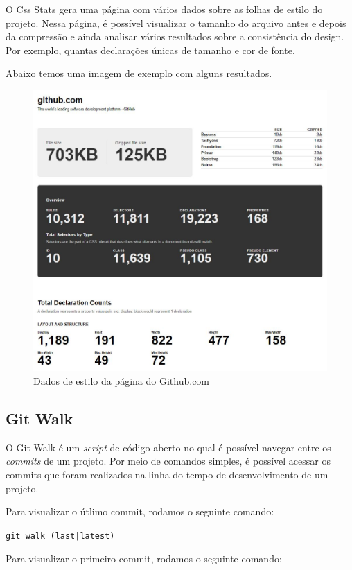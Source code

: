 O Css Stats gera uma página com vários dados sobre as folhas de estilo do projeto. Nessa página, é possível visualizar o tamanho do arquivo antes e depois da compressão e ainda analisar vários resultados sobre a consistência do design. Por exemplo, quantas declarações únicas de tamanho e cor de fonte.

Abaixo temos uma imagem de exemplo com alguns resultados.

\begin{figure}[H]
\centering
\includegraphics{figuras/Capturar.JPG}
\caption{Dados de estilo da página do Github.com}
\end{figure}

\hypertarget{gitwalk}{%
\subsection{Git Walk}\label{gitwalk}}

O Git Walk é um \emph{script} de código aberto no qual é possível navegar entre os \emph{commits} de um projeto. Por meio de comandos simples, é possível acessar os commits que foram realizados na linha do tempo de desenvolvimento de um projeto.  

Para visualizar o útlimo commit, rodamos o seguinte comando:

\texttt{git walk (last|latest)}

Para visualizar o primeiro commit, rodamos o seguinte comando:

